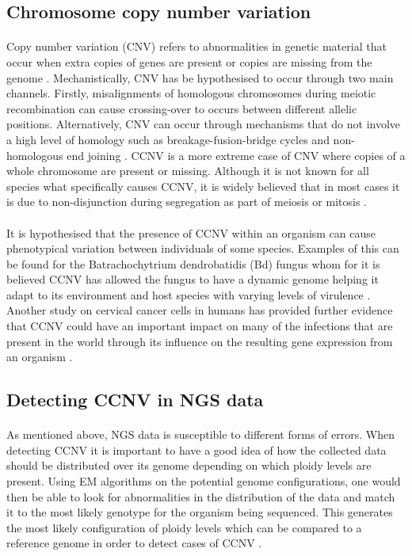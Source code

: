 \documentclass[11pt]{article}
\begin{document}
\subsection{Chromosome copy number variation}
\paragraph{}Copy number variation (CNV) refers to abnormalities in genetic material that occur when extra copies of genes are present or copies are missing from the genome \autocite{Joao2015}. Mechanistically, CNV has be hypothesised to occur through two main channels. Firstly, misalignments of homologous chromosomes during meiotic recombination can cause crossing-over to occurs between different allelic positions. Alternatively, CNV can occur through mechanisms that do not involve a high level of homology such as breakage-fusion-bridge cycles and non-homologous end joining \autocite{Hastings2010}. CCNV is a more extreme case of CNV where copies of a whole chromosome are present or missing. Although it is not known for all species what specifically causes CCNV, it is widely believed that in most cases it is due to non-disjunction during segregation as part of meiosis or mitosis \autocite{Farrer2013}. 
\paragraph{}It is hypothesised that the presence of CCNV within an organism can cause phenotypical variation between individuals of some species. Examples of this can be found for the Batrachochytrium dendrobatidis (Bd) fungus whom for it is believed CCNV has allowed the fungus to have a dynamic genome helping it adapt to its environment and host species with varying levels of virulence \autocite{Farrer2013}. Another study on cervical cancer cells in humans has provided further evidence that CCNV could have an important impact on many of the infections that are present in the world through its influence on the resulting gene expression from an organism \autocite{Yan2017}. 
\\
\subsection{Detecting CCNV in NGS data}
\paragraph{}As mentioned above, NGS data is susceptible to different forms of errors. When detecting CCNV it is important to have a good idea of how the collected data should be distributed over its genome depending on which ploidy levels are present. Using EM algorithms on the potential genome configurations, one would then be able to look for abnormalities in the distribution of the data and match it to the most likely genotype for the organism being sequenced. This generates the most likely configuration of ploidy levels which can be compared to a reference genome in order to detect cases of CCNV \autocite{Schwarzbauer2010}.
\\
\end{document}
